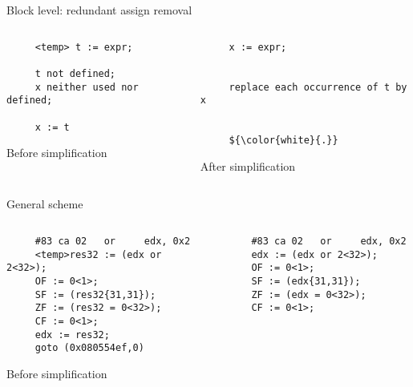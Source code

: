 \begin{frame}[fragile]{Block level: redundant assign removal}
     \begin{columns}[t]
     \begin{column}[T]{5.5cm}
     \lstset{basicstyle=\tiny, stepnumber=10000}
     \begin{lstlisting}
     <temp> t := expr;

     t not defined;
     x neither used nor defined;

     x := t
     \end{lstlisting}
     \begin{center}
     \vspace{-1.1cm}
     {\scriptsize Before simplification}
     \end{center}
     \end{column}
     \begin{column}[T]{5.5cm}
     \lstset{escapechar=$, basicstyle=\tiny, stepnumber=10000}
     \begin{lstlisting}
     x := expr;


     replace each occurrence of t by x


     ${\color{white}{.}}
     \end{lstlisting}
     \begin{center}
     \vspace{-1.1cm}
     {\scriptsize After simplification}
     \end{center}
     \end{column}
     \end{columns}
     \begin{center}
     \vspace{-0.5cm}
     {\scriptsize General scheme}
     \end{center}
     \begin{columns}[t]
     \begin{column}[T]{5.5cm}
     \lstset{basicstyle=\tiny, stepnumber=10000}
     \begin{lstlisting}
     #83 ca 02   or 	edx, 0x2 
     <temp>res32 := (edx or 2<32>);
     OF := 0<1>;
     SF := (res32{31,31});
     ZF := (res32 = 0<32>);
     CF := 0<1>;
     edx := res32;
     goto (0x080554ef,0) 
     \end{lstlisting}
     \vspace{-1.1cm}
     \begin{center}
     {\scriptsize Before simplification}
     \end{center}
     \end{column}
     \begin{column}[T]{5.5cm}
     \lstset{basicstyle=\tiny, stepnumber=10000}
     \begin{lstlisting}
     #83 ca 02   or 	edx, 0x2 
     edx := (edx or 2<32>);
     OF := 0<1>;
     SF := (edx{31,31});
     ZF := (edx = 0<32>);
     CF := 0<1>;


\end{lstlisting}
\end{column}
\end{columns}
\end{frame}
